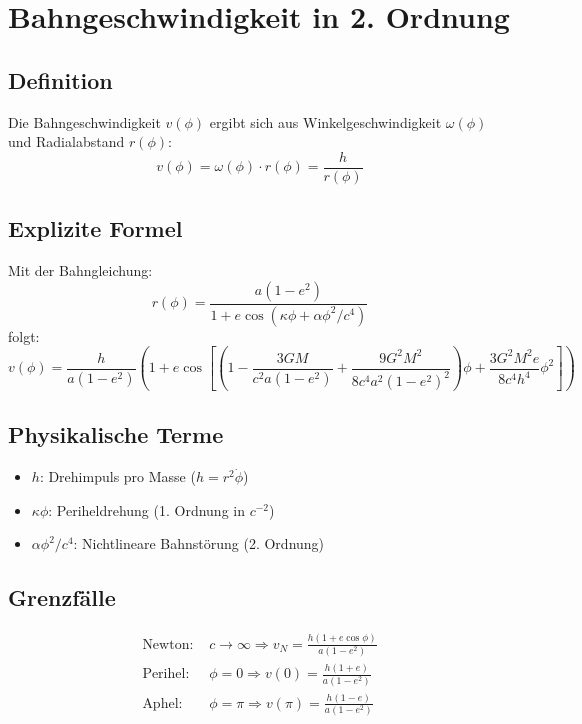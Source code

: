 \section{Bahngeschwindigkeit in 2. Ordnung}
\subsection*{Definition}
Die Bahngeschwindigkeit $v(\phi)$ ergibt sich aus Winkelgeschwindigkeit $\omega(\phi)$ und Radialabstand $r(\phi)$:
\begin{equation}
v(\phi) = \omega(\phi) \cdot r(\phi) = \frac{h}{r(\phi)}
\end{equation}

\subsection{Explizite Formel}
Mit der Bahngleichung:
\begin{equation}
r(\phi) = \frac{a(1-e^2)}{1 + e\cos\left(\kappa\phi + \alpha\phi^2/c^4\right)}
\end{equation}
folgt:
\begin{equation}\boxed{
v(\phi) = \frac{h}{a(1-e^2)} \left(1 + e\cos\left[\left(1 - \frac{3GM}{c^2a(1-e^2)} + \frac{9G^2M^2}{8c^4a^2(1-e^2)^2}\right)\phi + \frac{3G^2M^2e}{8c^4h^4}\phi^2\right]\right)
}\end{equation}

\subsection*{Physikalische Terme}
\begin{itemize}[leftmargin=*,noitemsep]
    \item $h$: Drehimpuls pro Masse ($h = r^2\dot{\phi}$)
    \item $\kappa\phi$: Periheldrehung (1. Ordnung in $c^{-2}$)
    \item $\alpha\phi^2/c^4$: Nichtlineare Bahnstörung (2. Ordnung)
\end{itemize}

\subsection*{Grenzfälle}
\begin{align*}
    \text{Newton: } & c \to \infty \Rightarrow v_N = \frac{h(1+e\cos\phi)}{a(1-e^2)} \\
    \text{Perihel: } & \phi=0 \Rightarrow v(0) = \frac{h(1+e)}{a(1-e^2)} \\
    \text{Aphel: } & \phi=\pi \Rightarrow v(\pi) = \frac{h(1-e)}{a(1-e^2)}
\end{align*}
